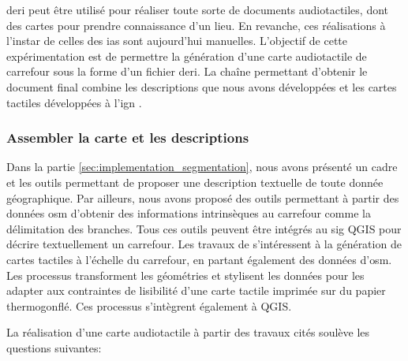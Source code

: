 \gls{deri} peut être utilisé pour réaliser toute sorte de documents audiotactiles, dont des cartes pour prendre connaissance d'un lieu. En revanche, ces réalisations à l'instar de celles des \glspl{ia} sont aujourd'hui manuelles. L'objectif de cette expérimentation est de permettre la génération d'une carte audiotactile de carrefour sous la forme d'un fichier \gls{deri}. La chaîne permettant d'obtenir le document final combine les descriptions que nous avons développées  et les cartes tactiles développées à l'\gls{ign} \citep{Jiang2023}.

\subsubsection{Assembler la carte et les descriptions}

Dans la partie \ref{sec:implementation_segmentation}, nous avons présenté un cadre et les outils permettant de proposer une description textuelle de toute donnée géographique. Par ailleurs, nous avons proposé des outils permettant à partir des données \gls{osm} d'obtenir des informations intrinsèques au carrefour comme la délimitation des branches. Tous ces outils peuvent être intégrés au \gls{sig} QGIS pour décrire textuellement un carrefour. Les travaux de \citet{Jiang2023} s'intéressent à la génération de cartes tactiles à l'échelle du carrefour, en partant également des données d'\gls{osm}. Les processus transforment les géométries et stylisent les données pour les adapter aux contraintes de lisibilité d'une carte tactile imprimée sur du papier thermogonflé. Ces processus s'intègrent également à QGIS.

\newpar{}

La réalisation d'une carte audiotactile à partir des travaux cités soulève les questions suivantes:

